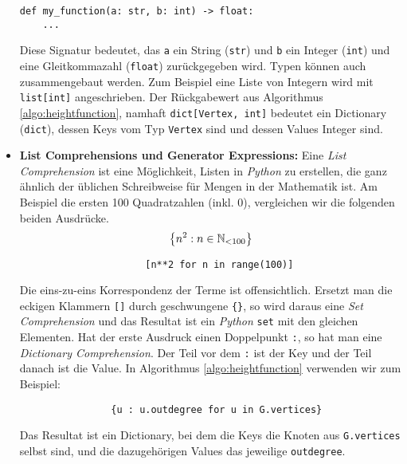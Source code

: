 \documentclass[../main.tex]{subfiles}
\begin{document}
\begin{appendices}
\begin{itemize}
    \begin{verbatim}
def my_function(a: str, b: int) -> float:
    ...
    \end{verbatim}

    Diese Signatur bedeutet, das \verb|a| ein String (\verb|str|) und \verb|b| ein Integer (\verb|int|) und eine Gleitkommazahl (\verb|float|) zurückgegeben wird. Typen können auch zusammengebaut werden. Zum Beispiel eine Liste von Integern wird mit \verb|list[int]| angeschrieben. Der Rückgabewert aus Algorithmus \ref{algo:heightfunction}, namhaft \verb|dict[Vertex, int]| bedeutet ein Dictionary (\verb|dict|), dessen Keys vom Typ \verb|Vertex| sind und dessen Values Integer sind.

    \item \textbf{List Comprehensions und Generator Expressions:} Eine \emph{List Comprehension} ist eine Möglichkeit, Listen in \emph{Python} zu erstellen, die ganz ähnlich der üblichen Schreibweise für Mengen in der Mathematik ist. Am Beispiel die ersten 100 Quadratzahlen (inkl. $0$), vergleichen wir die folgenden beiden Ausdrücke.
    $$\left\{n^2 : n \in \mathbb{N}_{<100}\right\}$$

    \begin{verbatim}
                      [n**2 for n in range(100)]
    \end{verbatim}

    Die eins-zu-eins Korrespondenz der Terme ist offensichtlich. Ersetzt man die eckigen Klammern \verb|[]| durch geschwungene \verb|{}|, so wird daraus eine \emph{Set Comprehension} und das Resultat ist ein \emph{Python} \verb|set| mit den gleichen Elementen. Hat der erste Ausdruck einen Doppelpunkt \verb|:|, so hat man eine \emph{Dictionary Comprehension}. Der Teil vor dem \verb|:| ist der Key und der Teil danach ist die Value. In Algorithmus \ref{algo:heightfunction} verwenden wir zum Beispiel:

    \begin{verbatim}
                {u : u.outdegree for u in G.vertices}
    \end{verbatim}

    Das Resultat ist ein Dictionary, bei dem die Keys die Knoten aus \verb|G.vertices| selbst sind, und die dazugehörigen Values das jeweilige \verb|outdegree|.




\end{itemize}


\end{appendices}
\end{document}
